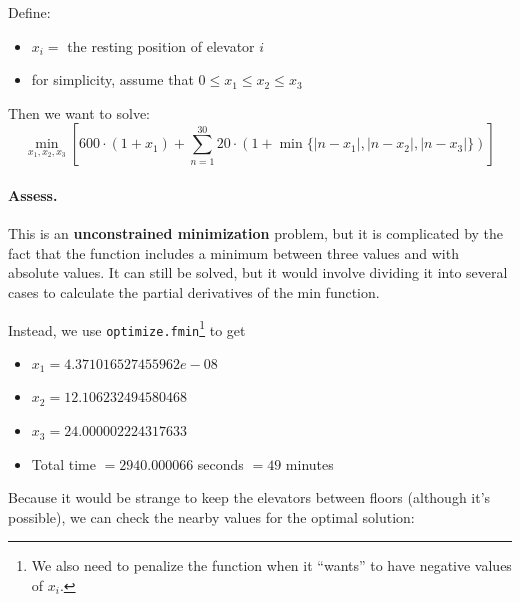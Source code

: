 \begin{enumerate}
Define:
\begin{itemize}
	\item $x_i = $ the resting position of elevator $i$
	\item for simplicity, assume that $0 \leq x_1 \leq x_2 \leq x_3$
\end{itemize}

Then we want to solve:
\[
\min_{x_1, x_2, x_3} \left[ 600 \cdot (1+x_1) + \sum_{n=1}^{30} 20 \cdot \left( 1 + \min\big\{ |n-x_1|, |n-x_2|, |n-x_3|\big\} \right) \right]
\]

\paragraph{Assess. } This is an \textbf{unconstrained minimization} problem, but it is complicated by the fact that the function includes a minimum between three values and with absolute values. It can still be solved, but it would involve dividing it into several cases to calculate the partial derivatives of the min function.  %
%

Instead, we use \texttt{optimize.fmin}\footnote{We also need to penalize the function when it ``wants'' to have negative values of $x_i$.} to get 
\begin{itemize}
	\item $x_1 = 4.371016527455962e-08$
	\item $x_2 = 12.106232494580468$
	\item $x_3 = 24.000002224317633$
	\item Total time $= 2940.000066 $ seconds $= 49$ minutes
\end{itemize}

Because it would be strange to keep the elevators between floors (although it's possible), we can check the nearby values for the optimal solution:


\end{enumerate}
